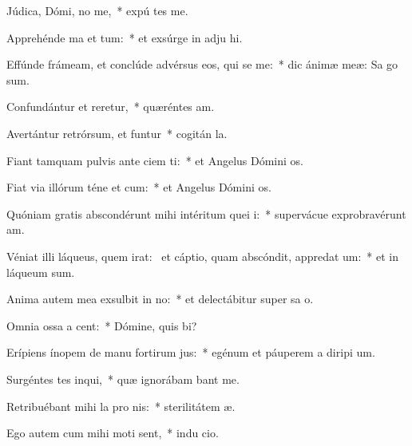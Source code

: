 \item Júdica, Dómi, no me,~* expú tes me.
\item Apprehénde ma et tum:~* et exsúrge in adju hi.
\item Effúnde frámeam, et conclúde advérsus eos, qui se me:~* dic ánimæ meæ: Sa  go sum.
\item Confundántur et reretur,~* quæréntes  am.
\item Avertántur retrórsum, et funtur~* cogitán  la.
\item Fiant tamquam pulvis ante ciem ti:~* et Angelus Dómini  os.
\item Fiat via illórum téne et cum:~* et Angelus Dómini  os.
\item Quóniam gratis abscondérunt mihi intéritum quei i:~* supervácue exprobravérunt  am.
\item Véniat illi láqueus, quem irat:~\pscross{} et cáptio, quam abscóndit, appredat um:~* et in láqueum   sum.
\item Anima autem mea exsulbit in no:~* et delectábitur super sa o.
\item Omnia ossa a cent:~* Dómine, quis  bi?
\item Erípiens ínopem de manu fortirum jus:~* egénum et páuperem a diripi um.
\item Surgéntes tes inqui,~* quæ ignorábam bant me.
\item Retribuébant mihi la pro nis:~* sterilitátem  æ.
\item Ego autem cum mihi moti sent,~* indu cio.
